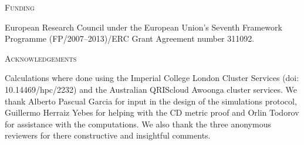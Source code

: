 \documentclass[12pt,letterpaper]{article}
\renewcommand{\section}[1]{%
\bigskip
\begin{center}
\begin{Large}
\normalfont\scshape #1
\medskip
\end{Large}
\end{center}}
\begin{document}
\section{Funding}
European Research Council under the European Union’s Seventh Framework Programme (FP/2007–2013)/ERC Grant Agreement number 311092.

\section{Acknowledgements}
Calculations where done using the Imperial College London Cluster Services (doi: 10.14469/hpc/2232) and the Australian QRIScloud Awoonga cluster services. We thank Alberto Pascual Garcia for input in the design of the simulations protocol, Guillermo Herraiz Yebes for helping with the CD metric proof and Orlin Todorov for assistance with the computations. We also thank the three anonymous reviewers for there constructive and insightful comments.



\end{document}
